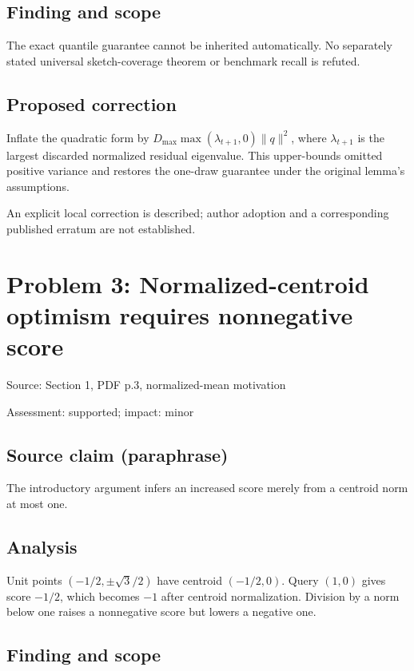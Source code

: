 \documentclass[11pt]{article}
\begin{document}
\subsection*{Finding and scope}

The exact quantile guarantee cannot be inherited automatically. No separately stated universal sketch-coverage theorem or benchmark recall is refuted.

\subsection*{Proposed correction}

Inflate the quadratic form by \(D_{\max}\max(\lambda_{t+1},0)\|q\|^2\), where \(\lambda_{t+1}\) is the largest discarded normalized residual eigenvalue. This upper-bounds omitted positive variance and restores the one-draw guarantee under the original lemma’s assumptions.

An explicit local correction is described; author adoption and a corresponding published erratum are not established.

\section*{Problem 3: Normalized-centroid optimism requires nonnegative score}

Source: Section 1, PDF p.3, normalized-mean motivation

Assessment: supported; impact: minor

\subsection*{Source claim (paraphrase)}

The introductory argument infers an increased score merely from a centroid norm at most one.

\subsection*{Analysis}

Unit points \((-1/2,\pm\sqrt3/2)\) have centroid \((-1/2,0)\). Query \((1,0)\) gives score \(-1/2\), which becomes \(-1\) after centroid normalization. Division by a norm below one raises a nonnegative score but lowers a negative one.

\subsection*{Finding and scope}
\end{document}
